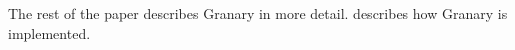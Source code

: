 \documentclass[preprint]{sigplanconf}
\begin{document}



The rest of the paper describes Granary in more detail.  describes how Granary is implemented. 
\end{document}
